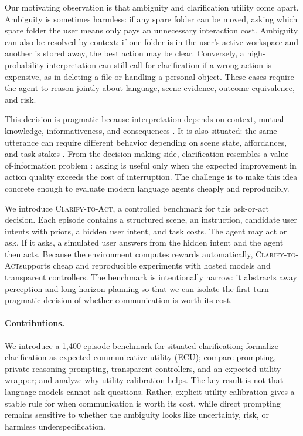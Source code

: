\documentclass{article} %
\newcommand{\task}{\textsc{Clarify-to-Act}}
\newcommand{\ecu}{\textsc{ECU}}
\begin{document}
Our motivating observation is that ambiguity and clarification utility come apart. Ambiguity is sometimes harmless: if any spare folder can be moved, asking which spare folder the user means only pays an unnecessary interaction cost. Ambiguity can also be resolved by context: if one folder is in the user's active workspace and another is stored away, the best action may be clear. Conversely, a high-probability interpretation can still call for clarification if a wrong action is expensive, as in deleting a file or handling a personal object. These cases require the agent to reason jointly about language, scene evidence, outcome equivalence, and risk.

This decision is pragmatic because interpretation depends on context, mutual knowledge, informativeness, and consequences \citep{grice1975logic,sperber1986relevance,clark1986referring,clark1996using,frank2012predicting,goodman2016pragmatic}. It is also situated: the same utterance can require different behavior depending on scene state, affordances, and task stakes \citep{bisk2020experience,min2024situated}. From the decision-making side, clarification resembles a value-of-information problem \citep{rao2018learning,horvitz1999principles}: asking is useful only when the expected improvement in action quality exceeds the cost of interruption. The challenge is to make this idea concrete enough to evaluate modern language agents cheaply and reproducibly.

We introduce \task, a controlled benchmark for this ask-or-act decision. Each episode contains a structured scene, an instruction, candidate user intents with priors, a hidden user intent, and task costs. The agent may act or ask. If it asks, a simulated user answers from the hidden intent and the agent then acts. Because the environment computes rewards automatically, \task supports cheap and reproducible experiments with hosted models and transparent controllers. The benchmark is intentionally narrow: it abstracts away perception and long-horizon planning so that we can isolate the first-turn pragmatic decision of whether communication is worth its cost.

\paragraph{Contributions.}
We introduce a 1,400-episode benchmark for situated clarification; formalize clarification as expected communicative utility (\ecu); compare prompting, private-reasoning prompting, transparent controllers, and an expected-utility wrapper; and analyze why utility calibration helps. The key result is not that language models cannot ask questions. Rather, explicit utility calibration gives a stable rule for when communication is worth its cost, while direct prompting remains sensitive to whether the ambiguity looks like uncertainty, risk, or harmless underspecification.
\end{document}
